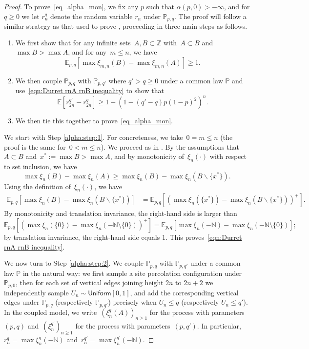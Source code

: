 \documentclass[pdflatex,sn-mathphys-num]{sn-jnl}%
\newcommand{\bbE}{{\ensuremath{\mathbb E}} }
\newcommand{\bbN}{{\ensuremath{\mathbb N}} }
\newcommand{\bbP}{{\ensuremath{\mathbb P}} }
\newcommand{\1}{{\ensuremath{\mathbf{1}}} }
\theoremstyle{thmstyleone}%
\theoremstyle{thmstyletwo}%
\theoremstyle{thmstylethree}%
\begin{document}
\begin{proof}
To prove~\eqref{eq_alpha_mon}, we fix any $p$ such that $\alpha(p,0)> -\infty$, and for $q\geq 0$ we let $r_n^q$ denote the random variable $r_n$ under $\bbP_{p,q}$. The proof will follow a similar strategy as that used to prove \cite[Equation (12)]{Durrett84}, proceeding in three main steps as follows.
\begin{enumerate}
\item\label{alpha:step:1} We first show that for any infinite sets~$A,B \subset \mathbb Z$ with~$A \subset B$ and~$\max B > \max A$, and for any~$m \le n$, we have
\begin{equation}\label{eqn:Durret rnA rnB inequality}
\bbE_{p,q}[\max\xi_{m,n}(B) - \max\xi_{m,n}(A)] \ge 1.
\end{equation}
\item\label{alpha:step:2} We then couple $\bbP_{p,q}$ with $\bbP_{p,q'}$ where $q'>q\geq 0$ under a common law $\bbP$ and use~\eqref{eqn:Durret rnA rnB inequality} to show that
		\begin{equation}
		\label{eq_for_step2}
	\bbE [r_{2n}^{q'} - r^{q}_{2n}] \geq 1-(1-(q'-q)p(1-p)^2)^n.
		\end{equation}
\item\label{alpha:step:3} We then tie this together to prove~\eqref{eq_alpha_mon}.
\end{enumerate}

	We start with Step \ref{alpha:step:1}. For concreteness, we take~$0 = m \le n$ (the proof is the same for~$0 < m \le n$). We proceed as in  \cite[Equation (13)]{Durrett84}. By the assumptions that~$A \subset B$ and~$x^* := \max B > \max A$, and by monotonicity of~$\xi_n(\cdot)$ with respect to set inclusion, we have
\[\max\xi_n(B) - \max\xi_n(A) \ge  \max\xi_n(B) - \max\xi_n(B \backslash \{x^*\}).\]
Using the definition of~$\xi_n(\cdot)$, we have
\begin{align*}
    \bbE_{p,q}[\max\xi_n(B) - \max\xi_n(B \backslash \{x^*\})] & = \bbE_{p,q}\left[\left(\max\xi_n(\{x^*\})- \max \xi_n(B \backslash \{x^*\}) \right)^+ \right].
\end{align*}
By  monotonicity and translation invariance, the right-hand side is larger than
\[\bbE_{p,q}\left[ \left( \max \xi_n(\{0\}) -  \max \xi_n(-\bbN\setminus \{0\}) \right)^+\right] = \bbE_{p,q}[\max \xi_n(-\bbN) - \max \xi_n(-\bbN\setminus \{0\}) ];\]
by translation invariance, the right-hand side equals 1. This proves~\eqref{eqn:Durret rnA rnB inequality}.

We now turn to Step \ref{alpha:step:2}. We couple $\bbP_{p,q}$ with $\bbP_{p,q'}$ under a common law $\bbP$ in the natural way: we first sample a site percolation configuration under $\bbP_{p,0}$, then for each set of vertical edges joining height $2n$ to $2n+2$ we independently sample $U_n\sim \textsf{Uniform}[0,1]$, and add the corresponding vertical edges under $\bbP_{p,q}$ (respectively $\bbP_{p,q'}$) precisely when $U_n \leq q$ (respectively $U_n \leq q'$). In the coupled model, we write~$(\xi^{q}_n(A))_{n \ge 1}$ for the process with parameters~$(p,q)$ and~$(\xi^{q'}_n)_{n\ge 1}$ for the process with parameters~$(p,q')$. In particular,~$r^q_n = \max\xi_n^q(-\bbN)$ and~$r^{q'}_n = \max\xi^{q'}_n(-\bbN)$.


\end{proof}
\end{document}
